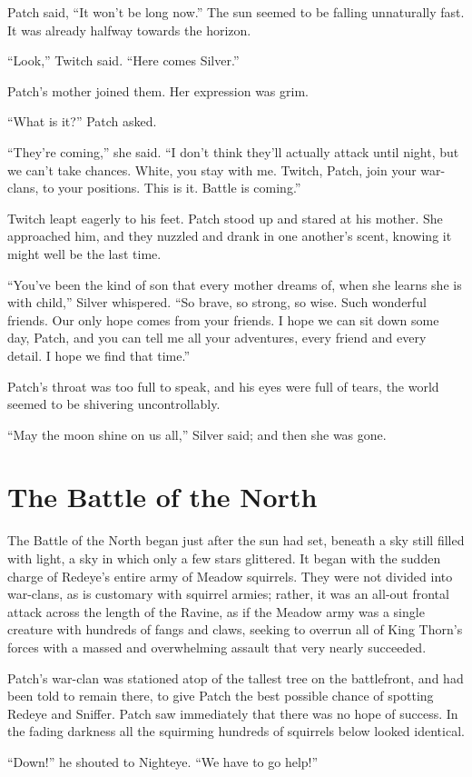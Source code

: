 \documentclass[ebook,oneside,openany,17pt]{memoir}
\renewcommand{\thechapter}{\Roman{chapter}}
\newcounter{sections}
\newcommand{\sections}[1]{%
  \section*{#1}
  \addtocounter{sections}{1}%
  \pdfbookmark[1]{#1}{section.\thechapter.\thesections}}
\begin{document}
Patch said, “It won’t be long now.” The sun seemed to be falling
unnaturally fast. It was already halfway towards the horizon.

“Look,” Twitch said. “Here comes Silver.”

Patch’s mother joined them. Her expression was grim.

“What is it?” Patch asked.

“They’re coming,” she said. “I don’t think they’ll actually attack
until night, but we can’t take chances. White, you stay with
me. Twitch, Patch, join your war-clans, to your positions. This is
it. Battle is coming.”

Twitch leapt eagerly to his feet. Patch stood up and stared at his
mother. She approached him, and they nuzzled and drank in one
another’s scent, knowing it might well be the last time.

“You’ve been the kind of son that every mother dreams of, when she
learns she is with child,” Silver whispered. “So brave, so strong, so
wise. Such wonderful friends. Our only hope comes from your friends. I
hope we can sit down some day, Patch, and you can tell me all your
adventures, every friend and every detail. I hope we find that time.”

Patch’s throat was too full to speak, and his eyes were full of tears,
the world seemed to be shivering uncontrollably.

“May the moon shine on us all,” Silver said; and then she was gone.


\sections{The Battle of the North}

The Battle of the North began just after the sun had set, beneath a
sky still filled with light, a sky in which only a few stars
glittered. It began with the sudden charge of Redeye’s entire army of
Meadow squirrels. They were not divided into war-clans, as is
customary with squirrel armies; rather, it was an all-out frontal
attack across the length of the Ravine, as if the Meadow army was a
single creature with hundreds of fangs and claws, seeking to overrun
all of King Thorn’s forces with a massed and overwhelming assault that
very nearly succeeded.

Patch’s war-clan was stationed atop of the tallest tree on the
battlefront, and had been told to remain there, to give Patch the best
possible chance of spotting Redeye and Sniffer. Patch saw immediately
that there was no hope of success. In the fading darkness all the
squirming hundreds of squirrels below looked identical.

“Down!” he shouted to Nighteye. “We have to go help!”
\end{document}
